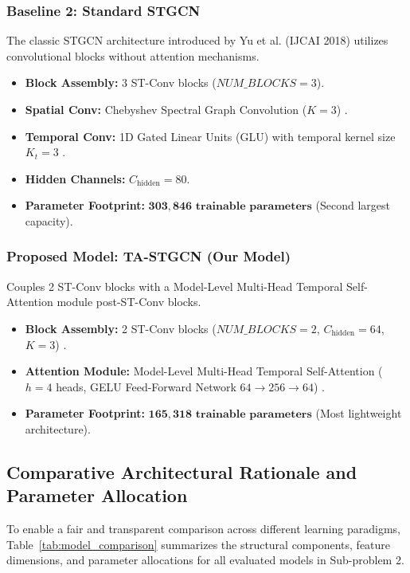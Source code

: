 \subsubsection{Baseline 2: Standard STGCN}
The classic STGCN architecture introduced by Yu et al. \cite{stgcn} (IJCAI 2018) utilizes convolutional blocks without attention mechanisms.
\begin{itemize}
    \item \textbf{Block Assembly:} 3 ST-Conv blocks ($NUM\_BLOCKS=3$).
    \item \textbf{Spatial Conv:} Chebyshev Spectral Graph Convolution ($K=3$) \cite{chebnet}.
    \item \textbf{Temporal Conv:} 1D Gated Linear Units (GLU) with temporal kernel size $K_t=3$ \cite{stgcn}.
    \item \textbf{Hidden Channels:} $C_{\text{hidden}} = 80$.
    \item \textbf{Parameter Footprint:} $\mathbf{303,846 \text{ trainable parameters}}$ (Second largest capacity).
\end{itemize}

\subsubsection{Proposed Model: TA-STGCN (Our Model)}
Couples 2 ST-Conv blocks \cite{stgcn} with a Model-Level Multi-Head Temporal Self-Attention module \cite{attention} post-ST-Conv blocks.
\begin{itemize}
    \item \textbf{Block Assembly:} 2 ST-Conv blocks ($NUM\_BLOCKS=2$, $C_{\text{hidden}}=64$, $K=3$) \cite{stgcn, chebnet}.
    \item \textbf{Attention Module:} Model-Level Multi-Head Temporal Self-Attention ($h=4$ heads, GELU Feed-Forward Network $64 \to 256 \to 64$) \cite{attention}.
    \item \textbf{Parameter Footprint:} $\mathbf{165,318 \text{ trainable parameters}}$ (Most lightweight architecture).
\end{itemize}

\subsection{Comparative Architectural Rationale and Parameter Allocation}

To enable a fair and transparent comparison across different learning paradigms, Table~\ref{tab:model_comparison} summarizes the structural components, feature dimensions, and parameter allocations for all evaluated models in Sub-problem 2.

